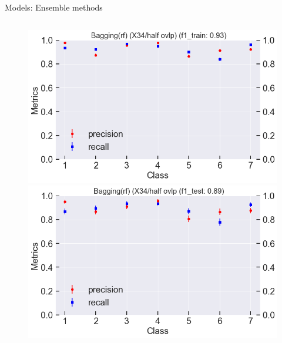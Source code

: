 \documentclass{if-beamer}
\begin{document}
\begin{frame}{Models:  Ensemble methods}
\begin{columns}
\begin{column}{0.5\textwidth}
             \begin{figure}
            \includegraphics[scale=0.23]{./figs/bagging_X34_train.png}
            \includegraphics[scale=0.23]{./figs/bagging_X34_test.png}
            \end{figure}  
        
 \end{column}

 \end{columns}
  \end{frame}
  
  
  
\end{document}
